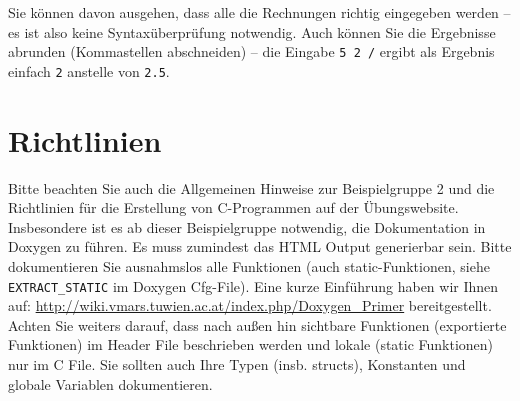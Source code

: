 \documentclass{article}
\begin{document}
Sie können davon ausgehen, dass alle die Rechnungen richtig eingegeben
werden – es ist also keine Syntaxüberprüfung notwendig. Auch können
Sie die Ergebnisse abrunden (Kommastellen abschneiden) – die Eingabe
\verb_5 2 /_ ergibt als Ergebnis einfach \verb_2_ anstelle von
\verb_2.5_.


\section*{Richtlinien}
Bitte beachten Sie auch die Allgemeinen Hinweise zur Beispielgruppe 2 und die Richtlinien f\"ur die Erstellung von C-Programmen auf der \"Ubungswebsite.
Insbesondere ist es ab dieser Beispielgruppe notwendig, die Dokumentation in Doxygen zu f\"uhren. Es muss zumindest das HTML Output generierbar sein. Bitte dokumentieren Sie ausnahmslos alle Funktionen (auch static-Funktionen, siehe \verb|EXTRACT_STATIC| im Doxygen Cfg-File). Eine kurze Einf\"uhrung haben wir Ihnen auf: \url{http://wiki.vmars.tuwien.ac.at/index.php/Doxygen_Primer} bereitgestellt. Achten Sie weiters darauf, dass nach au{\ss}en hin sichtbare Funktionen (exportierte Funktionen) im Header File beschrieben werden und lokale (static Funktionen) nur im C File. Sie sollten auch Ihre Typen (insb. structs), Konstanten und globale Variablen dokumentieren. 
\end{document}
